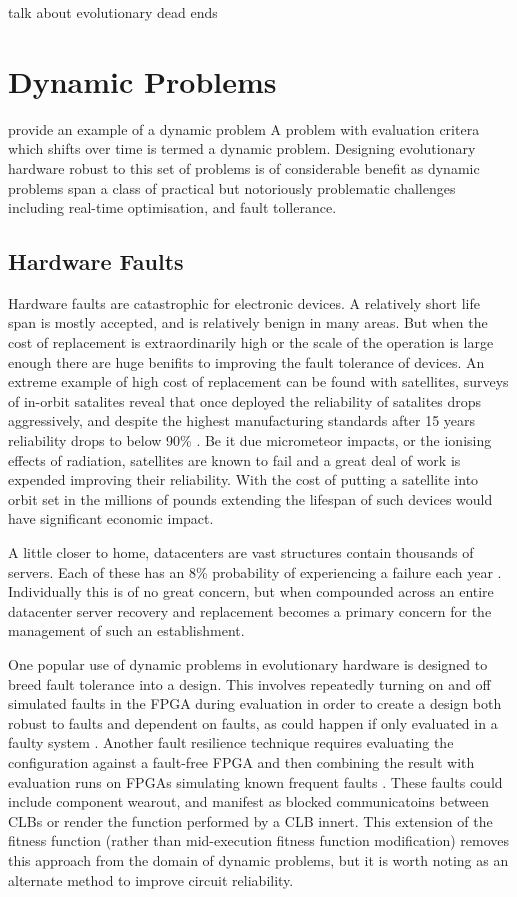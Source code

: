 \todo talk about evolutionary dead ends

\section{Dynamic Problems}

\todo provide an example of a dynamic problem
A problem with evaluation critera which shifts over time is termed a dynamic problem. Designing
evolutionary hardware robust to this set of problems is of considerable benefit as
dynamic problems span a class of practical but notoriously problematic challenges including
real-time optimisation, and fault tollerance.

\subsection{Hardware Faults}
Hardware faults are catastrophic for electronic devices. A relatively short life span is
mostly accepted, and is relatively benign in many areas. But when the cost of replacement is
extraordinarily high or the scale of the operation is large enough there are huge benifits
to improving the fault tolerance of devices. An extreme example of high cost of replacement
can be found with satellites, surveys of in-orbit satalites reveal that once deployed the
reliability of satalites drops aggressively, and despite the highest manufacturing standards
after 15 years reliability drops to below
90\% \cite{CASTET20091718}. Be it due micrometeor impacts,
or the ionising effects of radiation, satellites are known to fail and a great deal of
work is expended improving their reliability. With the cost
of putting a satellite into orbit set in the millions of pounds extending the lifespan
of such devices would have significant economic impact.

A little closer to home, datacenters are vast structures contain thousands of servers.
Each of these has an 8\% probability of experiencing a failure each year
 \cite{Vishwanath:2010:CCC:1807128.1807161}.
Individually this is of no great concern, but when compounded across an entire datacenter
server recovery and replacement becomes a primary concern for the management of
such an establishment.

One popular use of dynamic problems in evolutionary hardware is designed to breed
fault tolerance into a
design. This involves repeatedly turning on and off simulated faults in the FPGA during
evaluation in order to
create a design both robust to faults and dependent on faults, as could happen if
only evaluated in a faulty system \cite{651463}. Another fault resilience
technique requires evaluating the configuration
against a fault-free FPGA and then combining the result with evaluation runs on FPGAs
simulating known frequent faults \cite{Keymeulen2000}. These faults could include component
wearout, and manifest as blocked communicatoins between CLBs or render the function
performed by a CLB innert. This extension of the fitness function (rather than
mid-execution fitness function modification) removes this approach from the domain of dynamic problems,
but it is worth noting as an alternate method to improve circuit reliability.

